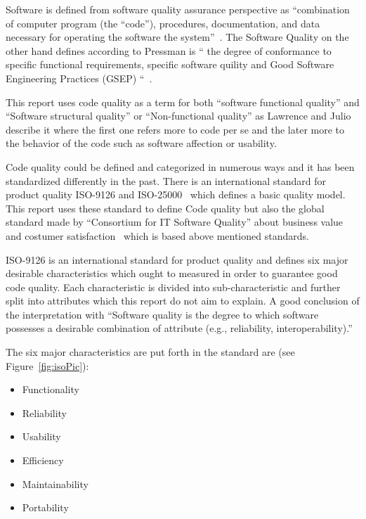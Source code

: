 Software is defined from software quality assurance perspective as “combination of computer program (the “code”), procedures, documentation, and data necessary for operating the software the system”~\cite{Galin}. The Software Quality on the other hand defines according to Pressman is “ the degree of conformance to specific functional requirements, specific software quility and Good Software Engineering Practices (GSEP) “~\cite{Pressman}. 

This report uses code quality as a term for both “software functional quality” and “Software structural quality” or “Non-functional quality” as Lawrence and Julio~\cite{Chung} describe it where the first one refers more to code per se and the later more to the behavior of the code such as software affection or usability. 

Code quality could be defined and categorized in numerous ways and it has been standardized differently in the past. There is an international standard for product quality ISO-9126 and ISO-25000~\cite{ISO9126}  which defines a basic quality model. This report uses these standard to define Code quality but also the global standard made by “Consortium for IT Software Quality” about business value and costumer satisfaction~\cite{cisq} which is based above mentioned standards. 

ISO-9126 is an international standard for product quality and defines six major desirable characteristics which ought to measured in order to guarantee good code quality. Each characteristic is divided into sub-characteristic and further split into attributes which this report do not aim to explain. A good conclusion of the interpretation with 
“Software quality is the degree to which software possesses a desirable combination of attribute (e.g., reliability, interoperability).”~\cite{ISO1061}

The six major characteristics are put forth in the standard are (see Figure~\ref{fig:isoPic}): 
\begin{itemize}
\item Functionality 
\item Reliability
\item Usability
\item Efficiency
\item Maintainability
\item Portability
\end{itemize}